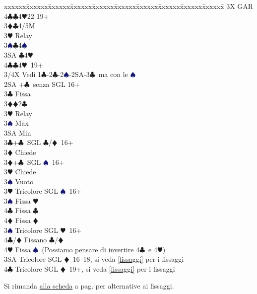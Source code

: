 \documentclass[a4paper,italian]{article}
\newcommand{\BC}{\textcolor{OliveGreen}{$\clubsuit$}}
\newcommand{\BD}{\textcolor{RedOrange}{$\vardiamondsuit$}}
\newcommand{\BH}{\textcolor{Red2}{$\varheartsuit${}}}
\newcommand{\BS}{\textcolor{MidnightBlue}{$\spadesuit${}}}
\newenvironment{bidtable}
{\begin{tabbing}

    xxxxxx\=xxxxxx\=xxxxxx\=xxxxxx\=xxxxxx\=xxxxxx\=xxxxxx\=xxxxxx\=xxxxxx\=xxxxxx\=\kill}
{\end{tabbing} }%
\begin{document}
\begin{bidtable}
                                    3X \> GAR\\
                                    4\BC {}\BC 4\BH 22 19+\-\-\\
                                    3\BD {}\BC 4/5M\+\\
                                    3\BH \> Relay\+\\
                                    3\BS {}\BC 4\BS \\
                                    3SA \BC 4\BH \\
                                    4\BC {}\BC 4\BH\ 19+\-\-\\
                                    3/4X \> Vedi 1\BC -2\BC -2\BS -2SA-3\BC\ ma con le \BS \-\-\\
                                    2SA +\BC\ senza SGL 16+\+\\
                                    3\BC \> Fissa\\
                                    3\BD {}\BD 2\BC \\
                                    3\BH \> Relay\+\\
                                    3\BS \> Max\\
                                    3SA \> Min\-\-\\
                                    3\BC {}+\BC\ SGL \BC /\BD\ 16+\+\\
                                    3\BD \> Chiede\-\\
                                    3\BD {}+\BC\ SGL \BS\ 16+\+\\
                                    3\BH \> Chiede\+\\
                                    3\BS \> Vuoto\-\-\\
                                    3\BH \> Tricolore SGL \BS\ 16+\+\\
                                    3\BS \> Fissa \BH \\
                                    4\BC \> Fissa \BC \\
                                    4\BD \> Fissa \BD \-\\
                                    3\BS \> Tricolore SGL \BH\ 16+\+\\
                                    4\BC/\BD \> Fissano \BC /\BD \\
                                    4\BH \> Fissa \BS\ (Possiamo pensare di invertire 4\BC\ e 4\BH )\-\\
                                    3SA \> Tricolore SGL \BD\ 16--18, si veda \ref{fissaggi} per i fissaggi\\
                                    4\BC \> Tricolore SGL \BD\ 19+, si veda \ref{fissaggi} per i fissaggi\\
                                \end{bidtable}
                                \bigbreak
                                Si rimanda \hyperref[fissaggi]{alla scheda} a pag. \pageref{fissaggi} per alternative ai fissaggi.
\end{document}
